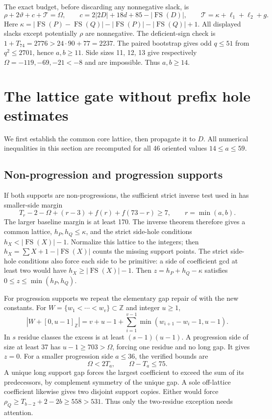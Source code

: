 \documentclass[11pt,a4paper]{article}
\newcommand{\FS}{\operatorname{FS}}
\newcommand{\Z}{\mathbb Z}
\newcommand{\T}{\mathcal T}
\begin{document}
The exact budget, before discarding any nonnegative slack, is
\begin{equation}\label{budget}
 \rho+2\vartheta+c+\T=\Omega,\qquad
 c=2|2D|+18d+85-|\FS(D)|,\qquad
 \T=\kappa+\ell_1+\ell_2+g.
\end{equation}
Here $\kappa=|\FS(P)-\FS(Q)|-|\FS(P)|-|\FS(Q)|+1$.
All displayed slacks except potentially $\rho$ are nonnegative.
The deficient-sign check is $1+T_{74}=2776>24\cdot90+77=2237$.
The paired bootstrap gives odd $q\le51$ from $q^2\le2701$, hence
$a,b\ge11$. Side sizes 11, 12, 13 give respectively
$\Omega=-119,-69,-21<-8$ and are impossible. Thus $a,b\ge14$.

\section{The lattice gate without prefix hole estimates}
We first establish the common core lattice, then propagate it to $D$.
All numerical inequalities in this section are recomputed for all 46
oriented values $14\le a\le59$.

\subsection{Non-progression and progression supports}
If both supports are non-progressions, the sufficient strict inverse test
used in \cite{previous} has smaller-side margin
\[
 T_r-2-\Omega+(r-3)+f(r)+f(73-r)\ge7,
 \qquad r=\min(a,b).
\]
The larger baseline margin is at least 170. The inverse theorem therefore
gives a common lattice, $h_P,h_Q\le\kappa$, and the strict side-hole
conditions $h_X<|\FS(X)|-1$. Normalize this lattice to the integers; then
$h_X=\sum X+1-|\FS(X)|$ counts the missing support points.
The strict side-hole conditions also force each side to be primitive:
a side of coefficient gcd at least two would have
$h_X\ge|\FS(X)|-1$.
Then $z=h_P+h_Q-\kappa$ satisfies $0\le z\le\min(h_P,h_Q)$.

For progression supports we repeat the elementary gap repair of
\cite{previous} with the new constants. For $W=\{w_1<\cdots<w_v\}\subset\Z$ and integer $u\ge1$,
\[
 |W+[0,u-1]_{\Z}|=v+u-1+
 \sum_{i=1}^{v-1}\min(w_{i+1}-w_i-1,u-1).
\]
In $s$ residue classes the excess is at least $(s-1)(u-1)$.
A progression side of size at least 37 has $u-1\ge703>\Omega$,
forcing one residue and no long gap. It gives $z=0$.
For a smaller progression side $a\le36$, the verified bounds are
\[
 \Omega<2T_a,\qquad \Omega-T_a\le75.
\]
A unique long support gap forces the largest coefficient to exceed the
sum of its predecessors, by complement symmetry of the unique gap.
A sole off-lattice coefficient likewise gives two disjoint support copies.
Either would force $\rho_Q\ge T_{b-2}+2-2b\ge558>531$.
Thus only the two-residue exception needs attention.
\end{document}
